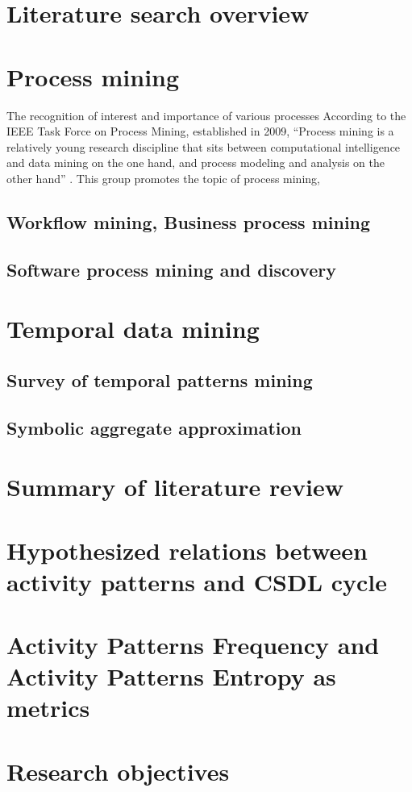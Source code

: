\section{Literature search overview}

\section{Process mining}
The recognition of interest and importance of various processes 
According to the IEEE Task Force on Process Mining, established in 2009, ``Process mining is 
a relatively young research discipline that sits between computational intelligence and data 
mining on the one hand, and process modeling and analysis on the other hand'' \cite{citeulike:11077707}.
This group promotes the topic of process mining,

\subsection{Workflow mining, Business process mining}\label{mackground.bpm}


\subsection{Software process mining and discovery}


\section{Temporal data mining}
\subsection{Survey of temporal patterns mining}
\subsection{Symbolic aggregate approximation}

\section{Summary of literature review}

\section{Hypothesized relations between activity patterns and CSDL cycle}

\section{Activity Patterns Frequency and Activity Patterns Entropy as metrics}

\section{Research objectives}